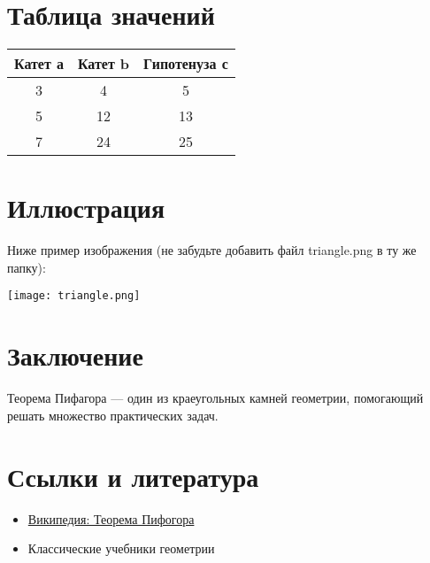\documentclass{article}
\begin{document}
\section{Таблица значений}
\hspace{3cm}
\begin{tabular}{|c|c|c|}
\hline
Катет а & Катет b & Гипотенуза с \\
\hline
3 & 4 & 5 \\
\hline
5 & 12 & 13 \\
\hline
7 & 24 & 25 \\
\hline
\end{tabular}
\section{Иллюстрация}
Ниже пример изображения (не забудьте добавить файл triangle.png в ту же папку):
\begin{center}
\newline
\texttt{[image: triangle.png]}
\end{center}
\section{Заключение}
Теорема Пифагора — один из краеугольных камней геометрии, помогающий решать
множество практических задач.
\section{Ссылки и литература}
\begin{itemize}
\item \href{https://ru.wikipedia.org/wiki/Теорема_Пифагора}{Википедия: Теорема Пифогора}
\item Классические учебники геометрии
\end{itemize}
\end{document}
